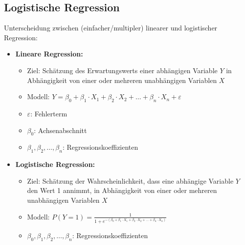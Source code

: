 \subsection{Logistische Regression}

Unterscheidung zwischen (einfacher/multipler) linearer und logistischer Regression:

\begin{itemize}
    \item \textbf{Lineare Regression:}
    \begin{itemize}
        \item Ziel: Schätzung des Erwartungswerts einer abhängigen Variable \(Y\) in Abhängigkeit von einer oder mehreren unabhängigen Variablen \(X\)
        \item Modell: \(Y = \beta_0 + \beta_1 \cdot X_1 + \beta_2 \cdot X_2 + \ldots + \beta_n \cdot X_n + \varepsilon\)
        \item \(\varepsilon\): Fehlerterm
        \item \(\beta_0\): Achsenabschnitt
        \item \(\beta_1, \beta_2, \ldots, \beta_n\): Regressionskoeffizienten
    \end{itemize}
    \item \textbf{Logistische Regression:}
    \begin{itemize}
        \item Ziel: Schätzung der Wahrscheinlichkeit, dass eine abhängige Variable \(Y\) den Wert 1 annimmt, in Abhängigkeit von einer oder mehreren unabhängigen Variablen \(X\)
        \item Modell: \(P(Y=1) = \frac{1}{1+e^{-(\beta_0 + \beta_1 \cdot X_1 + \beta_2 \cdot X_2 + \ldots + \beta_n \cdot X_n)}}\)
        \item \(\beta_0, \beta_1, \beta_2, \ldots, \beta_n\): Regressionskoeffizienten
    \end{itemize}
\end{itemize}
